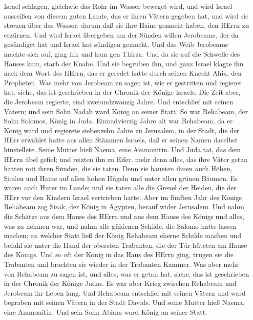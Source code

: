 Israel schlagen, gleichwie das Rohr im Wasser beweget wird, und wird
Israel ausreißen von diesem guten Lande, das er ihren Vätern gegeben
hat, und wird sie streuen über das Wasser, darum daß sie ihre Haine
gemacht haben, den HErrn zu erzürnen.  Und wird Israel
übergeben um der Sünden willen Jerobeams, der da gesündiget hat und
Israel hat sündigen gemacht.  Und das Weib Jerobeams machte
sich auf, ging hin und kam gen Thirza. Und da sie auf die Schwelle des
Hauses kam, starb der Knabe.  Und sie begruben ihn, und
ganz Israel klagte ihn nach dem Wort des HErrn, das er geredet hatte
durch seinen Knecht Ahia, den Propheten.  Was mehr von
Jerobeam zu sagen ist, wie er gestritten und regieret hat, siehe, das
ist geschrieben in der Chronik der Könige Israels.  Die
Zeit aber, die Jerobeam regierte, sind zweiundzwanzig Jahre. Und
entschlief mit seinen Vätern; und sein Sohn Nadab ward König an seiner
Statt.  So war Rehabeam, der Sohn Salomos, König in Juda.
Einundvierzig Jahre alt war Rehabeam, da er König ward und regierete
siebenzehn Jahre zu Jerusalem, in der Stadt, die der HErr erwählet hatte
aus allen Stämmen Israels, daß er seinen Namen daselbst hinstellete.
Seine Mutter hieß Naema, eine Ammonitin.  Und Juda tat, das
dem HErrn übel gefiel; und reizten ihn zu Eifer, mehr denn alles, das
ihre Väter getan hatten mit ihren Sünden, die sie taten. 
Denn sie baueten ihnen auch Höhen, Säulen und Haine auf allen hohen
Hügeln und unter allen grünen Bäumen.  Es waren auch Hurer
im Lande; und sie taten alle die Greuel der Heiden, die der HErr vor den
Kindern Israel vertrieben hatte.  Aber im fünften Jahr des
Königs Rehabeam zog Sisak, der König in Ägypten, herauf wider Jerusalem.
 Und nahm die Schätze aus dem Hause des HErrn und aus dem
Hause des Königs und alles, was zu nehmen war, und nahm alle güldenen
Schilde, die Salomo hatte lassen machen;  an welcher Statt
ließ der König Rehabeam eherne Schilde machen und befahl sie unter die
Hand der obersten Trabanten, die der Tür hüteten am Hause des Königs.
 Und so oft der König in das Haus des HErrn ging, trugen
sie die Trabanten und brachten sie wieder in der Trabanten Kammer.
 Was aber mehr von Rehabeam zu sagen ist, und alles, was er
getan hat, siehe, das ist geschrieben in der Chronik der Könige Judas.
 Es war aber Krieg zwischen Rehabeam und Jerobeam ihr Leben
lang.  Und Rehabeam entschlief mit seinen Vätern und ward
begraben mit seinen Vätern in der Stadt Davids. Und seine Mutter hieß
Naema, eine Ammonitin. Und sein Sohn Abiam ward König an seiner Statt.

